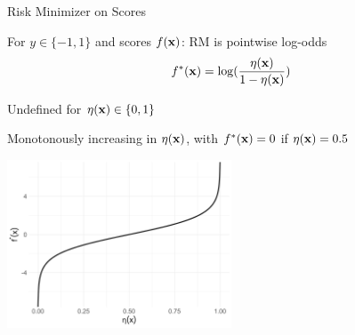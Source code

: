 \documentclass[11pt,compress,t,notes=noshow, xcolor=table]{beamer}
\begin{document}
\begin{vbframe}{Risk Minimizer on Scores}


\begin{itemizeS}
\item For $y \in \{-1, 1\}$ and scores $f(\mathbf{x})$: RM is pointwise log-odds
$$f^{\ast}(\mathbf{x}) =  \log (\frac{\eta(\mathbf{x}) }{1-\eta(\mathbf{x}) })$$
\item Undefined for $\eta(\mathbf{x}) \in \{0, 1\}$
\item Monotonously increasing in $\eta(\mathbf{x})$, with  $f^{\ast}(\mathbf{x}) = 0$ if $\eta(\mathbf{x})=0.5$

\end{itemizeS}

\vfill

\begin{center}
\includegraphics[width=0.5\textwidth]{figure/logistic_inverse.png}
\end{center}




\end{vbframe}
\end{document}
